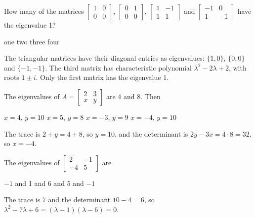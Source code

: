 \begin{question}[id=gate-cs2008-2, source=GATE CS 2008]
How many of the matrices $\begin{bmatrix} 1 & 0 \\ 0 & 0 \end{bmatrix}$, $\begin{bmatrix} 0 & 1 \\ 0 & 0 \end{bmatrix}$, $\begin{bmatrix} 1 & -1 \\ 1 & 1 \end{bmatrix}$ and $\begin{bmatrix} -1 & 0 \\ 1 & -1 \end{bmatrix}$ have the eigenvalue 1?
\begin{options}
  \correct one
  \option two
  \option three
  \option four
\end{options}
\begin{solution}
The triangular matrices have their diagonal entries as eigenvalues: $\{1, 0\}$, $\{0, 0\}$ and $\{-1, -1\}$. The third matrix has characteristic polynomial $\lambda^2 - 2\lambda + 2$, with roots $1 \pm i$. Only the first matrix has the eigenvalue 1.
\end{solution}
\end{question}

\begin{question}[id=gate-cs2010-1, source=GATE CS 2010, marks=2]
The eigenvalues of $A = \begin{bmatrix} 2 & 3 \\ x & y \end{bmatrix}$ are 4 and 8. Then
\begin{options}
  \option $x = 4$, $y = 10$
  \option $x = 5$, $y = 8$
  \option $x = -3$, $y = 9$
  \correct $x = -4$, $y = 10$
\end{options}
\begin{solution}
The trace is $2 + y = 4 + 8$, so $y = 10$, and the determinant is $2y - 3x = 4 \cdot 8 = 32$, so $x = -4$.
\end{solution}
\end{question}

\begin{question}[id=gate-cs2005-2, source=GATE CS 2005]
The eigenvalues of $\begin{bmatrix} 2 & -1 \\ -4 & 5 \end{bmatrix}$ are
\begin{options}
  \option $-1$ and 1
   and 6
   and 5
   and $-1$
\end{options}
\begin{solution}
The trace is 7 and the determinant $10 - 4 = 6$, so $\lambda^2 - 7\lambda + 6 = (\lambda - 1)(\lambda - 6) = 0$.
\end{solution}
\end{question}

